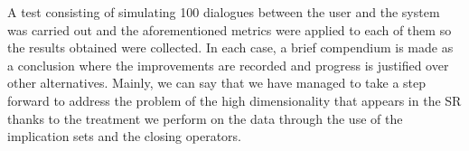 A test consisting of simulating 100 dialogues between the user and the system was carried out and the aforementioned metrics were applied to each of them so the results obtained were collected. In each case, a brief compendium is made as a conclusion where the improvements are recorded and progress is justified over other alternatives. Mainly, we can say that we have managed to take a step forward to address the problem of the high dimensionality that appears in the SR thanks to the treatment we perform on the data through the use of the implication sets and the closing operators.
